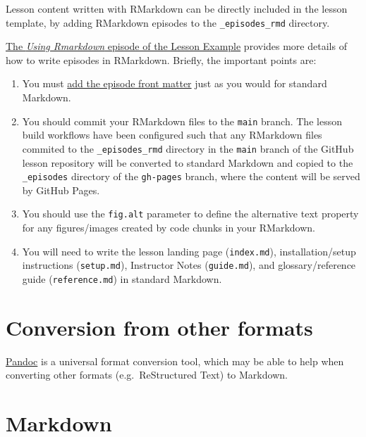 \documentclass[
]{book}
\providecommand{\tightlist}{%
  \setlength{\itemsep}{0pt}\setlength{\parskip}{0pt}}
\begin{document}
Lesson content written with RMarkdown can be directly included in the lesson template, by adding RMarkdown episodes to the \texttt{\_episodes\_rmd} directory.

\href{https://carpentries.github.io/lesson-example/05-rmarkdown-example/}{The \emph{Using Rmarkdown} episode of the Lesson Example}
provides more details of how to write episodes in RMarkdown.
Briefly, the important points are:

\begin{enumerate}
\def\labelenumi{\arabic{enumi}.}
\tightlist
\item
  You must \protect\hyperlink{add-yaml-front-matter}{add the episode front matter}
  just as you would for standard Markdown.
\item
  You should commit your RMarkdown files to the \texttt{main} branch.
  The lesson build workflows have been configured such that
  any RMarkdown files commited to the \texttt{\_episodes\_rmd} directory
  in the \texttt{main} branch of the GitHub lesson repository
  will be converted to standard Markdown and copied to
  the \texttt{\_episodes} directory of the \texttt{gh-pages} branch,
  where the content will be served by GitHub Pages.
\item
  You should use the \texttt{fig.alt} parameter to define the alternative text
  property for any figures/images created by code chunks in your RMarkdown.
\item
  You will need to write the lesson landing page (\texttt{index.md}),
  installation/setup instructions (\texttt{setup.md}),
  Instructor Notes (\texttt{guide.md}),
  and glossary/reference guide (\texttt{reference.md})
  in standard Markdown.
\end{enumerate}

\hypertarget{conversion-from-other-formats}{%
\section{Conversion from other formats}\label{conversion-from-other-formats}}

\href{https://pandoc.org/}{Pandoc} is a universal format conversion tool,
which may be able to help when converting other formats
(e.g.~ReStructured Text) to Markdown.

\hypertarget{markdown}{%
\section{Markdown}\label{markdown}}
\end{document}
